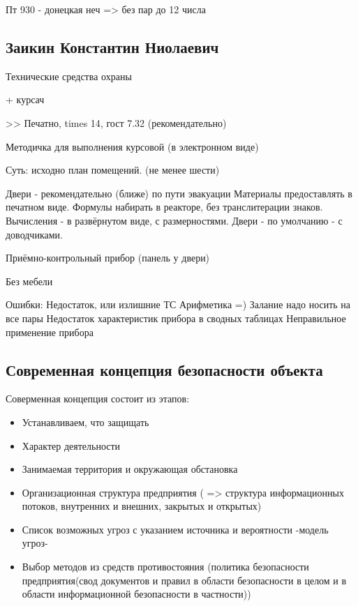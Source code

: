 \documentclass[a4paper,12pt]{report}
\begin{document}
	\def \nocredits {}
	\def \LineE {Конспект по дисциплине}
	\def \LineF {WEB-технология}

	\maketitle


Пт 930 - донецкая неч => без пар до 12
числа

\subsection*{Заикин Константин Ниолаевич}

Технические средства охраны

	+ курсач

	>> Печатно, times 14, гост 7.32 (рекомендательно)

	Методичка для выполнения курсовой (в электронном виде)

	Суть: исходно план помещений. (не менее шести)

	Двери - рекомендательно (ближе) по пути эвакуации
	Материалы предоставлять в печатном виде.
	Формулы набирать в реакторе, без транслитерации знаков. Вычисления - в развёрнутом виде, с размерностями.
	Двери - по умолчанию - с доводчиками.

	Приёмно-контрольный прибор (панель у двери)

	Без мебели


	Ошибки:
	Недостаток, или излишние ТС
	Арифметика =)
	Залание надо носить на все пары
	Недостаток характеристик прибора в сводных таблицах
	Неправильное применение прибора



	\subsection{Современная концепция безопасности объекта}
	Соверменная концепция состоит из этапов:
	\begin{itemize}
	\item	Устанавливаем, что защищать
		\item	Характер деятельности
		\item 	Занимаемая территория и окружающая обстановка
		\item	Организационная структура предприятия ( => структура информационных потоков, внутренних и внешних, закрытых и открытых)
	\item 	Список возможных угроз с указанием источника и вероятности -модель угроз-
	\item 	Выбор методов из средств противостояния (политика безопасности предприятия(свод документов и правил в области безопасности в целом и в области информационной безопасности в частности))
	\end{itemize}
\end{document}
